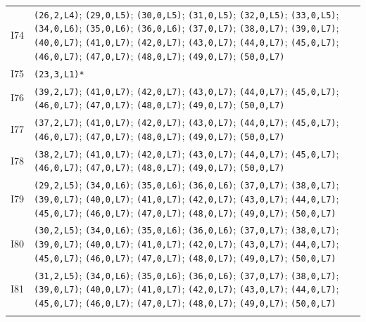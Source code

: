 {\begin{longtable}{@{}r p{14.7cm}@{}}
I74 & \texttt{(26,2,L4)}; \texttt{(29,0,L5)}; \texttt{(30,0,L5)}; \texttt{(31,0,L5)}; \texttt{(32,0,L5)}; \texttt{(33,0,L5)}; \texttt{(34,0,L6)}; \texttt{(35,0,L6)}; \texttt{(36,0,L6)}; \texttt{(37,0,L7)}; \texttt{(38,0,L7)}; \texttt{(39,0,L7)}; \texttt{(40,0,L7)}; \texttt{(41,0,L7)}; \texttt{(42,0,L7)}; \texttt{(43,0,L7)}; \texttt{(44,0,L7)}; \texttt{(45,0,L7)}; \texttt{(46,0,L7)}; \texttt{(47,0,L7)}; \texttt{(48,0,L7)}; \texttt{(49,0,L7)}; \texttt{(50,0,L7)}\\\addlinespace[3pt]
I75 & \texttt{(23,3,L1)*}\\\addlinespace[3pt]
I76 & \texttt{(39,2,L7)}; \texttt{(41,0,L7)}; \texttt{(42,0,L7)}; \texttt{(43,0,L7)}; \texttt{(44,0,L7)}; \texttt{(45,0,L7)}; \texttt{(46,0,L7)}; \texttt{(47,0,L7)}; \texttt{(48,0,L7)}; \texttt{(49,0,L7)}; \texttt{(50,0,L7)}\\\addlinespace[3pt]
I77 & \texttt{(37,2,L7)}; \texttt{(41,0,L7)}; \texttt{(42,0,L7)}; \texttt{(43,0,L7)}; \texttt{(44,0,L7)}; \texttt{(45,0,L7)}; \texttt{(46,0,L7)}; \texttt{(47,0,L7)}; \texttt{(48,0,L7)}; \texttt{(49,0,L7)}; \texttt{(50,0,L7)}\\\addlinespace[3pt]
I78 & \texttt{(38,2,L7)}; \texttt{(41,0,L7)}; \texttt{(42,0,L7)}; \texttt{(43,0,L7)}; \texttt{(44,0,L7)}; \texttt{(45,0,L7)}; \texttt{(46,0,L7)}; \texttt{(47,0,L7)}; \texttt{(48,0,L7)}; \texttt{(49,0,L7)}; \texttt{(50,0,L7)}\\\addlinespace[3pt]
I79 & \texttt{(29,2,L5)}; \texttt{(34,0,L6)}; \texttt{(35,0,L6)}; \texttt{(36,0,L6)}; \texttt{(37,0,L7)}; \texttt{(38,0,L7)}; \texttt{(39,0,L7)}; \texttt{(40,0,L7)}; \texttt{(41,0,L7)}; \texttt{(42,0,L7)}; \texttt{(43,0,L7)}; \texttt{(44,0,L7)}; \texttt{(45,0,L7)}; \texttt{(46,0,L7)}; \texttt{(47,0,L7)}; \texttt{(48,0,L7)}; \texttt{(49,0,L7)}; \texttt{(50,0,L7)}\\\addlinespace[3pt]
I80 & \texttt{(30,2,L5)}; \texttt{(34,0,L6)}; \texttt{(35,0,L6)}; \texttt{(36,0,L6)}; \texttt{(37,0,L7)}; \texttt{(38,0,L7)}; \texttt{(39,0,L7)}; \texttt{(40,0,L7)}; \texttt{(41,0,L7)}; \texttt{(42,0,L7)}; \texttt{(43,0,L7)}; \texttt{(44,0,L7)}; \texttt{(45,0,L7)}; \texttt{(46,0,L7)}; \texttt{(47,0,L7)}; \texttt{(48,0,L7)}; \texttt{(49,0,L7)}; \texttt{(50,0,L7)}\\\addlinespace[3pt]
I81 & \texttt{(31,2,L5)}; \texttt{(34,0,L6)}; \texttt{(35,0,L6)}; \texttt{(36,0,L6)}; \texttt{(37,0,L7)}; \texttt{(38,0,L7)}; \texttt{(39,0,L7)}; \texttt{(40,0,L7)}; \texttt{(41,0,L7)}; \texttt{(42,0,L7)}; \texttt{(43,0,L7)}; \texttt{(44,0,L7)}; \texttt{(45,0,L7)}; \texttt{(46,0,L7)}; \texttt{(47,0,L7)}; \texttt{(48,0,L7)}; \texttt{(49,0,L7)}; \texttt{(50,0,L7)}\\\addlinespace[3pt]

\end{longtable}}
